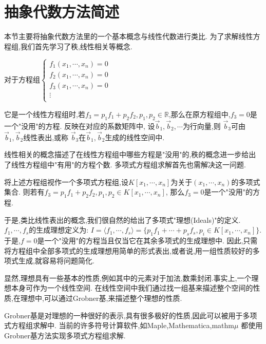 \section{抽象代数方法简述}
	本节主要将抽象代数方法里的一个基本概念与线性代数进行类比.
	为了求解线性方程组,我们首先学习了秩,线性相关等概念.

	对于方程组$ \begin{cases}
		f_1(x_1,\cdots,x_n)=0\\
		f_2(x_1,\cdots,x_n)=0\\
		f_3(x_1,\cdots,x_n)=0\\
		\vdots\\
	\end{cases}$
	
	它是一个线性方程组时,若$ f_3=p_1f_1+p_2f_2,p_1,p_2\in \mathbb{R}$,那么在原方程组中,$ f_3=0$是一个"没用"的方程.
	反映在对应的系数矩阵中,
	设$ \overrightarrow b_1,\overrightarrow b_2,\cdots $为行向量,则
	$ \overrightarrow b_3$可由$ \overrightarrow b_1,\overrightarrow b_2$线性表出,或称
	$ \overrightarrow b_3$在$ \overrightarrow b_1,\overrightarrow b_2$生成的线性空间中.

	线性相关的概念描述了在线性方程组中哪些方程是"没用"的,秩的概念进一步给出了线性方程组中"有用"的方程个数.
	多项式方程组求解首先也需解决这一问题.

	将上述方程组视作一个多项式方程组,设$ K[x_1,\cdots, x_n]$为关于$ (x_1,\cdots , x_n)$的多项式集合.
	则若有$ f_3 = p_1f_1 + p_2f_2,p_1,p_2\in K[x_1,\cdots, x_n]$,
	那么$ f_3=0$是一个"没用"的方程.

	于是,类比线性表出的概念,我们很自然的给出了多项式"理想(Ideals)"的定义.
	$ f_1,\cdots,f_s $的生成理想定义为: 
	$ I=\langle f_1,\cdots,f_s \rangle = \{p_1f_1+\cdots+p_sf_s,p_i\in K[x_1,\cdots,x_n]\}$.
	于是,$ f=0$是一个"没用"的方程当且仅当它在其余多项式的生成理想中.
	因此,只需将方程组中全部多项式的生成理想用简单的形式表出,或者说,用一组性质较好的多项式生成,就容易将问题简化.

	显然,理想具有一些基本的性质,例如其中的元素对于加法,数乘封闭.事实上,一个理想本身可作为一个线性空间.
	在线性空间中我们通过找一组基来描述整个空间的性质,在理想中,可以通过Grobner基,来描述整个理想的性质.

	Grobner基是对理想的一种很好的表示,具有很多极好的性质,因此可以被用于多项式方程组求解中.
	当前的许多符号计算软件,如Maple,Mathematica,mathm$ \mu$ 都使用Grobner基方法实现多项式方程组求解.


